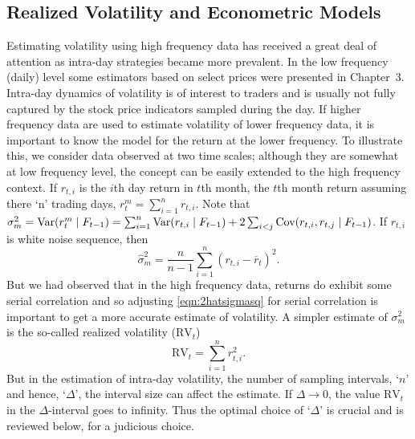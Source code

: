 \subsection{Realized Volatility and Econometric Models}

Estimating volatility using high frequency data has received a great deal of attention as intra-day strategies became more prevalent. In the low frequency (daily) level some estimators based on select prices were presented in Chapter~3. Intra-day dynamics of volatility is of interest to traders and is usually not fully captured by the stock price indicators sampled during the day. If higher frequency data are used to estimate volatility of lower frequency data, it is important to know the model for the return at the lower frequency. To illustrate this, we consider data observed at two time scales; although they are somewhat at low frequency level, the concept can be easily extended to the high frequency context. If $r_{t,i}$ is the $i$th day return in $t$th month, the $t$th month return assuming there `n' trading days, $r_t^m = \sum_{i=1}^n r_{t,i}$. Note that $\sigma_m^2 = \operatorname{Var}(r_t^m \;|\; F_{t-1}) = \sum_{i=1}^n \operatorname{Var}(r_{t,i} \;|\; F_{t-1}) + 2 \sum_{i<j} \operatorname{Cov}(r_{t,i}, r_{t,j} \;|\; F_{t-1})$. If $r_{t,i}$ is white noise sequence, then
	\begin{equation}\label{eqn:2hatsigmasq}
	\hat{\sigma}_m^2 = \frac{n}{n-1} \sum_{i=1}^n (r_{t,i} - \overline{r}_t)^2.
	\end{equation}
But we had observed that in the high frequency data, returns do exhibit some serial correlation and so adjusting \eqref{eqn:2hatsigmasq} for serial correlation is important to get a more accurate estimate of volatility. A simpler estimate of $\sigma_m^2$ is the so-called realized volatility ($\text{RV}_t$)
	\begin{equation} \label{eqn:2RV}
	\text{RV}_t = \sum_{i=1}^n r_{t,i}^2.
	\end{equation}
But in the estimation of intra-day volatility, the number of sampling intervals, `$n$' and hence, `$\Delta$', the interval size can affect the estimate. If $\Delta \rightarrow 0$, the value $\text{RV}_t$ in the $\Delta$-interval goes to infinity. Thus the optimal choice of `$\Delta$' is crucial and is reviewed below, for a judicious choice.


